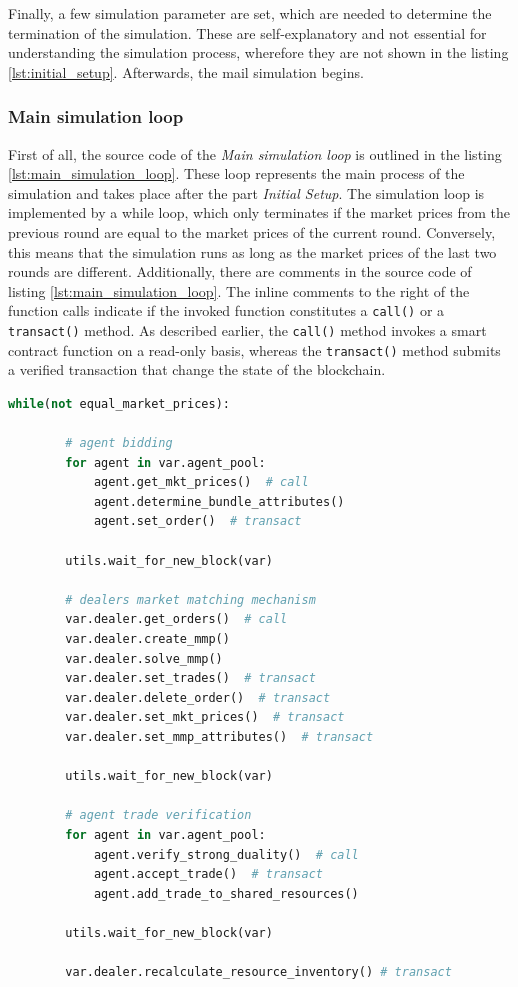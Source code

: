 Finally, a few simulation parameter are set, which are needed to determine the termination of the simulation.
These are self-explanatory and not essential for understanding the simulation process, wherefore they are not shown in the listing \ref{lst:initial_setup}.
Afterwards, the mail simulation begins.

\subsubsection{Main simulation loop}
First of all, the source code of the \textit{Main simulation loop} is outlined in the listing \ref{lst:main_simulation_loop}.
These loop represents the main process of the simulation and takes place after the part \textit{Initial Setup}.
The simulation loop is implemented by a while loop, which only terminates if the 
market prices from the previous round are equal to the market prices of the current round.
Conversely, this means that the simulation runs as long as the market prices of the last two rounds are different.
Additionally, there are comments in the source code of listing \ref{lst:main_simulation_loop}.
The inline comments to the right of the function calls indicate if the invoked function constitutes
a \verb|call()| or a \verb|transact()| method. As described earlier, the \verb|call()| method invokes 
a smart contract function on a read-only basis, whereas the \verb|transact()| method submits a verified transaction 
that change the state of the blockchain.

\begin{lstlisting}[float=htbp, label=lst:main_simulation_loop, caption=Main loop of the simulation, language=Python]
    while(not equal_market_prices):
        
        # agent bidding
        for agent in var.agent_pool:
            agent.get_mkt_prices()  # call
            agent.determine_bundle_attributes()
            agent.set_order()  # transact

        utils.wait_for_new_block(var)

        # dealers market matching mechanism
        var.dealer.get_orders()  # call
        var.dealer.create_mmp()
        var.dealer.solve_mmp()
        var.dealer.set_trades()  # transact
        var.dealer.delete_order()  # transact
        var.dealer.set_mkt_prices()  # transact
        var.dealer.set_mmp_attributes()  # transact

        utils.wait_for_new_block(var)

        # agent trade verification
        for agent in var.agent_pool:
            agent.verify_strong_duality()  # call
            agent.accept_trade()  # transact
            agent.add_trade_to_shared_resources()

        utils.wait_for_new_block(var)

        var.dealer.recalculate_resource_inventory() # transact        
\end{lstlisting}

